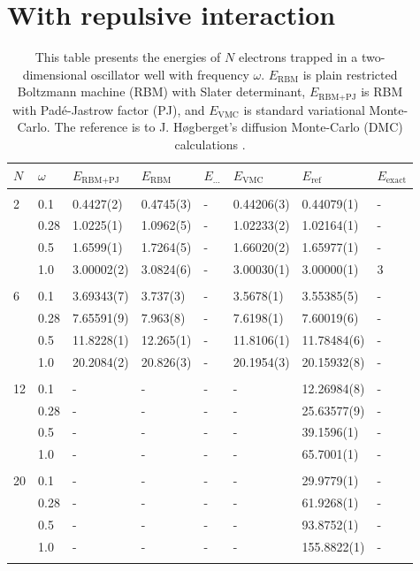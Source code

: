 \section{With repulsive interaction}
\begin{table} [H]
	\caption{This table presents the energies of $N$ electrons trapped in a two-dimensional oscillator well with frequency $\omega$. $E_{\text{RBM}}$ is plain restricted Boltzmann machine (RBM) with Slater determinant, $E_{\text{RBM+PJ}}$ is RBM with Padé-Jastrow factor (PJ), and $E_{\text{VMC}}$ is standard variational Monte-Carlo. The reference is to J. Høgberget's diffusion Monte-Carlo (DMC) calculations \cite{hogberget_quantum_2013}.} 
	\begin{tabularx}{\textwidth}{l:l|XXXXXX} \hline\hline
		\label{tab:quantumdotswinteraction2D}
		$N$ & $\omega$ & $E_{\text{RBM+PJ}}$ & $E_{\text{RBM}}$ & $E_{\text{...}}$ & $E_{\text{VMC}}$ & $E_{\text{ref}} $ & $E_{\text{exact}}$ \\ \hline \\
		2 & 0.1 & 0.4427(2) & 0.4745(3) & - & 0.44206(3) & 0.44079(1) & - \\ 
		& 0.28 & 1.0225(1) & 1.0962(5) & - & 1.02233(2) & 1.02164(1) & - \\
		& 0.5 & 1.6599(1) & 1.7264(5) & - & 1.66020(2) & 1.65977(1)  & - \\
		& 1.0 & 3.00002(2) & 3.0824(6) & - & 3.00030(1) & 3.00000(1) & 3  \\ \hdashline \\
		
		6 & 0.1 & 3.69343(7) & 3.737(3) & - & 3.5678(1) & 3.55385(5) & - \\ 
		& 0.28 & 7.65591(9) & 7.963(8) & - & 7.6198(1) & 7.60019(6) & - \\
		& 0.5 & 11.8228(1) & 12.265(1) & - & 11.8106(1) & 11.78484(6) & - \\
		& 1.0 & 20.2084(2) & 20.826(3) & - & 20.1954(3) & 20.15932(8) & - \\ \hdashline \\
		
		12 & 0.1 & - & - & - & - & 12.26984(8) & -\\ 
		& 0.28 & - & - & - & - & 25.63577(9) & -\\
		& 0.5 & - & - & - & - & 39.1596(1) & - \\
		& 1.0 & - & - & - & - & 65.7001(1) & - \\ \hdashline \\
		
		20 & 0.1 & - & - & - & - & 29.9779(1) & - \\ 
		& 0.28 & - & - & - & - & 61.9268(1) & - \\
		& 0.5 & - & - & - & - & 93.8752(1) & - \\
		& 1.0 & - & - & - & - & 155.8822(1) & - \\ \hdashline \\
		

\end{tabularx}
\end{table}
